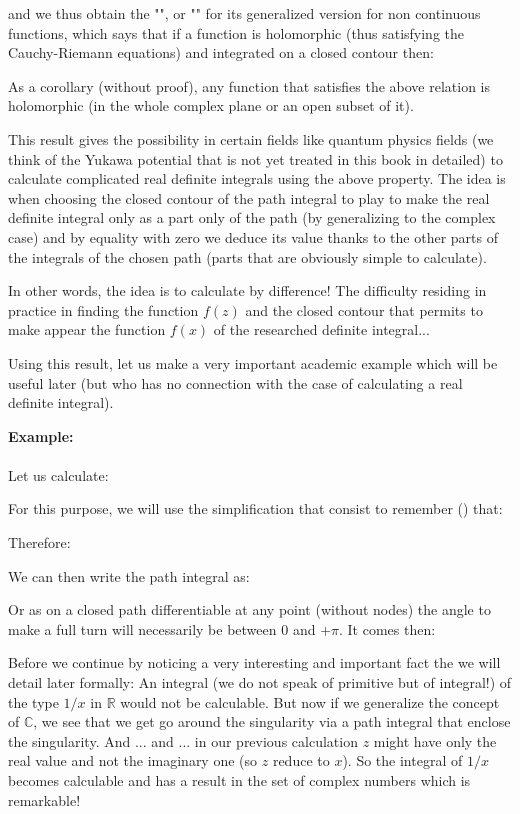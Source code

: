 	and we thus obtain the "", or "" for its generalized version for non continuous functions, which says that if a function is holomorphic (thus satisfying the Cauchy-Riemann equations) and integrated on a closed contour then:
	
	As a corollary (without proof), any function that satisfies the above relation is holomorphic (in the whole complex plane or an open subset of it).
	
	This result gives the possibility in certain fields like quantum physics fields (we think of the Yukawa potential that is not yet treated in this book in detailed) to calculate complicated real definite integrals using the above property. The idea is when choosing the closed contour of the path integral to play to make the real definite integral only as a part only of the path (by generalizing to the complex case) and by equality with zero we deduce its value thanks to the other parts of the integrals of the chosen path (parts that are obviously simple to calculate).
	
	In other words, the idea is to calculate by difference! The difficulty residing in practice in finding the function $f (z)$ and the closed contour that permits to make appear the function $f (x) $ of the researched definite integral...
	
	Using this result, let us make a very important academic example which will be useful later (but who has no connection with the case of calculating a real definite integral).
	\begin{tcolorbox}[colframe=black,colback=white,sharp corners]
	\textbf{{\Large {}}Example:}\\\\
	Let us calculate:
	
	For this purpose, we will use the simplification that consist to remember () that:
	
	Therefore:
	
	We can then write the path integral as:
	
	Or as on a closed path differentiable at any point (without nodes) the angle to make a full turn will necessarily be between $0$ and $+\pi$. It comes then:
	
	\end{tcolorbox}
	Before we continue by noticing a very interesting and important fact the we will detail later formally: An integral (we do not speak of primitive but of integral!) of the type $1/x$ in $\mathbb{R}$ would not be calculable. But now if we generalize the concept of $\mathbb{C}$, we see that we get go around the singularity via a path integral that enclose the singularity. And ... and ... in our previous calculation $z$ might have only the real value and not the imaginary one (so $z$ reduce to $x$). So the integral of $1/x$ becomes calculable and has a result in the set of complex numbers which is remarkable!
	
